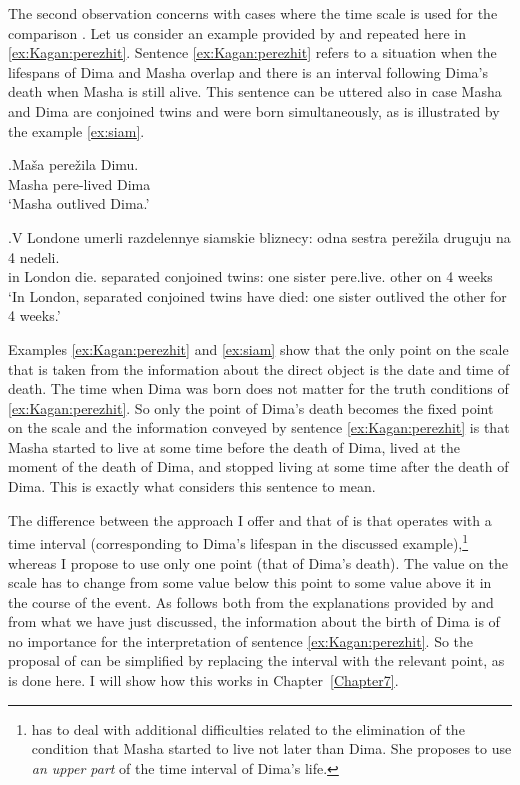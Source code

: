 The second observation concerns with cases where the time scale is used for the comparison . Let us consider an example provided by \citet[142]{Kagan:book} and repeated here in \ref{ex:Kagan:perezhit}. Sentence \ref{ex:Kagan:perezhit} refers to a situation when the lifespans of Dima and Masha overlap and there is an interval following Dima's death when Masha is still alive. This sentence can be uttered also in case Masha and Dima are conjoined twins and were born simultaneously, as is illustrated by the example \ref{ex:siam}.

\exg.\label{ex:Kagan:perezhit}Ma\v{s}a pere\v{z}ila Dimu.\\
Masha pere-lived Dima\\
\trans `Masha outlived Dima.'

\exg.\label{ex:siam}V Londone umerli razdelennye siamskie bliznecy: odna sestra pere\v{z}ila druguju na 4 nedeli.\\
in London die. separated conjoined twins: one sister pere.live. other on 4 weeks\\
\trans `In London, separated conjoined twins have died: one sister outlived the other for 4 weeks.'

Examples \ref{ex:Kagan:perezhit} and \ref{ex:siam} show that the only point on the scale that is taken from the information about the direct object is the date and time of death. The time when Dima was born does not matter for the truth conditions of \ref{ex:Kagan:perezhit}. So only the point of Dima's death becomes the fixed point on the scale and the information conveyed by sentence \ref{ex:Kagan:perezhit} is that Masha started to live at some time before the death of Dima, lived at the moment of the death of Dima, and stopped living at some time after the death of Dima. This is exactly what \citet{Kagan:book} considers this sentence to mean. 

The difference between the approach I offer and that of \citet{Kagan:book} is that \citet{Kagan:book} operates with a time interval (corresponding to Dima's lifespan in the discussed example),\footnote{\citet[143--144]{Kagan:book} has to deal with additional difficulties related to the elimination of the condition that Masha started to live not later than Dima. She proposes to use \textit{an upper part} of the time interval of Dima's life.} whereas I propose to use only one point (that of Dima's death). The value on the scale has to change from some value below this point to some value above it in the course of the event. As follows both from the explanations provided by \citet{Kagan:book} and from what we have just discussed, the information about the birth of Dima is of no importance for the interpretation of sentence \ref{ex:Kagan:perezhit}. So the proposal of \citet{Kagan:book} can be simplified by replacing the interval with the relevant point, as is done here. I will show how this works in Chapter~\ref{Chapter7}.

